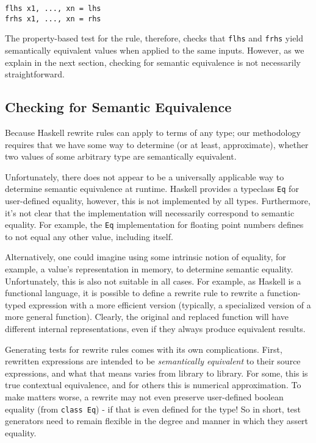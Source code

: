\begin{verbatim}
flhs x1, ..., xn = lhs
frhs x1, ..., xn = rhs
\end{verbatim}

The property-based test for the rule, therefore, checks that \texttt{flhs} and
\texttt{frhs} yield semantically equivalent values when applied to the same
inputs. However, as we explain in the next section, checking for semantic
equivalence is not necessarily straightforward.

\subsection{Checking for Semantic Equivalence}

Because Haskell rewrite rules can apply to terms of any type; our methodology
requires that we have some way to determine (or at least, approximate), whether
two values of some arbitrary type are semantically equivalent.

Unfortunately, there does not appear to be a universally applicable way to
determine semantic equivalence at runtime. Haskell provides a typeclass
\texttt{Eq} for user-defined equality, however, this is not implemented by all
types. Furthermore, it's not clear that the implementation will necessarily
correspond to semantic equality. For example, the \texttt{Eq} implementation for
floating point numbers defines \NaN to not equal any other value, including itself.

Alternatively, one could imagine using some intrinsic notion of equality, for
example, a value's representation in memory, to determine semantic equality.
Unfortunately, this is also not suitable in all cases. For example, as Haskell
is a functional language, it is possible to define a rewrite rule to rewrite a
function-typed expression with a more efficient version (typically, a
specialized version of a more general function). Clearly, the original and
replaced function will have different internal representations, even if they
always produce equivalent results.


Generating tests for rewrite rules comes with its own complications. First, rewritten expressions are intended to be \textit{semantically equivalent} to their source expressions, and what that means varies from library to library. For some, this is true contextual equivalence, and for others this is numerical approximation. To make matters worse, a rewrite may not even preserve user-defined boolean equality (from \texttt{class Eq}) - if that is even defined for the type! So in short, test generators need to remain flexible in the degree and manner in which they assert equality.

